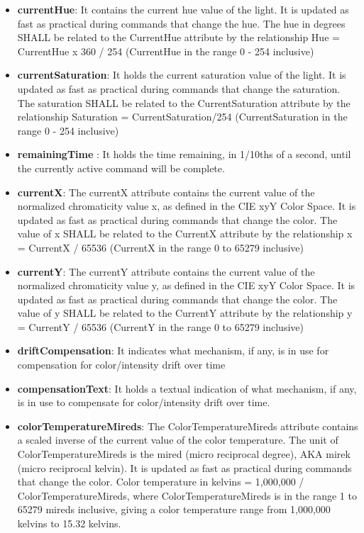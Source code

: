 \begin{itemize}
\item \textbf{currentHue}: It contains the current hue value of the light. It is updated as fast as practical during commands that change the hue. The hue in degrees SHALL be related to the CurrentHue attribute by the relationship Hue = CurrentHue x 360 / 254 (CurrentHue in the range 0 - 254 inclusive)
\item \textbf{currentSaturation}: It holds the current saturation value of the light. It is updated as fast as practical during commands that change the saturation. The saturation SHALL be related to the CurrentSaturation attribute by the relationship Saturation = CurrentSaturation/254 (CurrentSaturation in the range 0 - 254 inclusive)
\item \textbf{remainingTime  }: It holds the time remaining, in 1/10ths of a second, until the currently active command will be complete.
\item \textbf{currentX}: The currentX attribute contains the current value of the normalized chromaticity value x, as defined in the CIE xyY Color Space. It is updated as fast as practical during commands that change the color. The value of x SHALL be related to the CurrentX attribute by the relationship x = CurrentX / 65536 (CurrentX in the range 0 to 65279 inclusive)
\item \textbf{currentY}: The currentY attribute contains the current value of the normalized chromaticity value y, as defined in the CIE xyY Color Space. It is updated as fast as practical during commands that change the color. The value of y SHALL be related to the CurrentY attribute by the relationship y = CurrentY / 65536 (CurrentY in the range 0 to 65279 inclusive)
\item \textbf{driftCompensation}: It indicates what mechanism, if any, is in use for compensation for color/intensity drift over time
\item \textbf{compensationText}: It holds a textual indication of what mechanism, if any, is in use to compensate for color/intensity drift over time.
\item \textbf{colorTemperatureMireds}: The ColorTemperatureMireds attribute contains a scaled inverse of the current value of the color temperature. The unit of ColorTemperatureMireds is the mired (micro reciprocal degree), AKA mirek (micro reciprocal kelvin). It is updated as fast as practical during commands that change the color. Color temperature in kelvins = 1,000,000 / ColorTemperatureMireds, where ColorTemperatureMireds is in the range 1 to 65279 mireds inclusive, giving a color temperature range from 1,000,000 kelvins to 15.32 kelvins.

\end{itemize}
